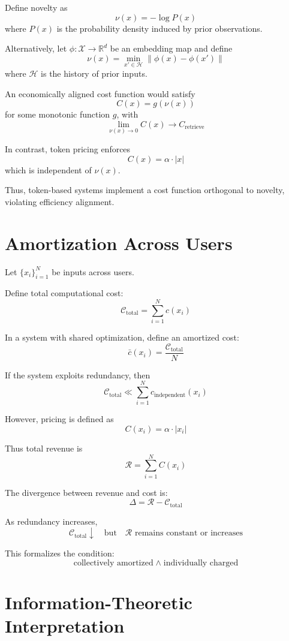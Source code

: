 \documentclass[12pt, oneside]{article}
\begin{document}
Define novelty as
\[
\nu(x) = -\log P(x)
\]
where $P(x)$ is the probability density induced by prior observations.

Alternatively, let $\phi : \mathcal{X} \to \mathbb{R}^d$ be an embedding map and define
\[
\nu(x) = \min_{x' \in \mathcal{H}} \| \phi(x) - \phi(x') \|
\]
where $\mathcal{H}$ is the history of prior inputs.

An economically aligned cost function would satisfy
\[
C(x) = g(\nu(x))
\]
for some monotonic function $g$, with
\[
\lim_{\nu(x)\to 0} C(x) \to C_{\text{retrieve}}
\]

In contrast, token pricing enforces
\[
C(x) = \alpha \cdot |x|
\]
which is independent of $\nu(x)$.

Thus, token-based systems implement a cost function orthogonal to novelty, violating efficiency alignment.

\section{Amortization Across Users}

Let $\{x_i\}_{i=1}^N$ be inputs across users.

Define total computational cost:
\[
\mathcal{C}_{\text{total}} = \sum_{i=1}^N c(x_i)
\]

In a system with shared optimization, define an amortized cost:
\[
\bar{c}(x_i) = \frac{\mathcal{C}_{\text{total}}}{N}
\]

If the system exploits redundancy, then
\[
\mathcal{C}_{\text{total}} \ll \sum_{i=1}^N c_{\text{independent}}(x_i)
\]

However, pricing is defined as
\[
C(x_i) = \alpha \cdot |x_i|
\]

Thus total revenue is
\[
\mathcal{R} = \sum_{i=1}^N C(x_i)
\]

The divergence between revenue and cost is:
\[
\Delta = \mathcal{R} - \mathcal{C}_{\text{total}}
\]

As redundancy increases,
\[
\mathcal{C}_{\text{total}} \downarrow \quad \text{but} \quad \mathcal{R} \text{ remains constant or increases}
\]

This formalizes the condition:
\[
\text{collectively amortized} \;\land\; \text{individually charged}
\]

\section{Information-Theoretic Interpretation}
\end{document}
